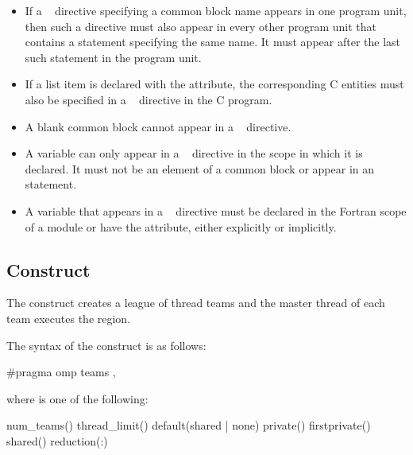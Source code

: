 \begin{fortranspecific}
\begin{itemize}
\item If a ~ directive specifying a common 
      block name appears in one program unit, then such a directive must 
      also appear in every other program unit that contains a  
      statement specifying the same name. It must appear after the last 
      such  statement in the program unit.

\item If a list item is declared with the  attribute, the 
      corresponding C entities must also be specified in a 
      ~ directive in the C program.

\item A blank common block cannot appear in a ~ 
      directive.

\item A variable can only appear in a ~ directive 
      in the scope in which it is declared. It must not be an element of a 
      common block or appear in an  statement.

\item A variable that appears in a ~ directive 
      must be declared in the Fortran scope of a module or have the 
       attribute, either explicitly or implicitly. 
\end{itemize}
\end{fortranspecific}







\subsection{ Construct}
\label{subsec:teams Construct}
\summary
The  construct creates a league of thread teams and the master thread of each 
team executes the region.

\syntax
\begin{ccppspecific}
The syntax of the  construct is as follows:

\begin{boxedcode}
\#pragma omp teams \plc{[clause[ [},\plc{] clause] ... ] new-line}
\end{boxedcode}

where  is one of the following:

\begin{indentedcodelist}
num\_teams()
thread\_limit()
default(shared \textnormal{|} none)
private()
firstprivate()
shared()
reduction(:)
\end{indentedcodelist}
\end{ccppspecific}

